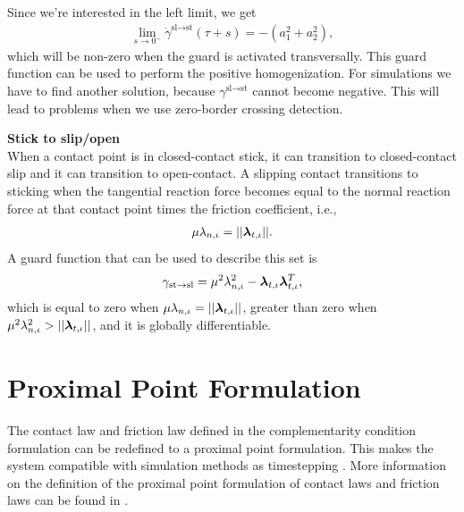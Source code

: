 \documentclass[../DC2017114Bouma.tex]{subfiles}
\begin{document}
Since we're interested in the left limit, we get
\begin{align}
\lim\limits_{s\rightarrow 0^-}\dot{\gamma}^{\text{sl}\rightarrow\text{st}}(\tau+s) = -(a^2_1 + a^2_2),
\end{align}
which will be non-zero when the guard is activated transversally. This guard function can be used to perform the positive homogenization. For simulations we have to find another solution, because $\gamma^{\text{sl}\rightarrow\text{st}}$ cannot become negative. This will lead to problems when we use zero-border crossing detection.

\textbf{Stick to slip/open}\\
When a contact point is in closed-contact stick, it can transition to closed-contact slip and it can transition to open-contact. A slipping contact transitions to sticking when the tangential reaction force becomes equal to the normal reaction force at that contact point times the friction coefficient, i.e.,
\begin{align}
\mu\lambda_{n,\iota} = ||\boldsymbol{\lambda}_{t,\iota}||.
\end{align}
A guard function that can be used to describe this set is
\begin{align}
\gamma_{\text{st}\rightarrow\text{sl}} = \mu^2\lambda^2_{n,\iota} - \boldsymbol{\lambda}_{t,\iota}\boldsymbol{\lambda}_{t,\iota}^T,\label{eq:appguardstsl}
\end{align}
which is equal to zero when $\mu\lambda_{n,\iota} = ||\boldsymbol{\lambda}_{t,\iota}||$, greater than zero when $\mu^2\lambda^2_{n,\iota} > ||\boldsymbol{\lambda}_{t,\iota}||$, and it is globally differentiable. 

\section{Proximal Point Formulation}
The contact law and friction law defined in the complementarity condition formulation can be redefined to a proximal point formulation. This makes the system compatible with simulation methods as timestepping \cite[Chapter 10]{Acary2008}. More information on the definition of the proximal point formulation of contact laws and friction laws can be found in \cite[Section 5.3]{Leine2008}.
\end{document}
